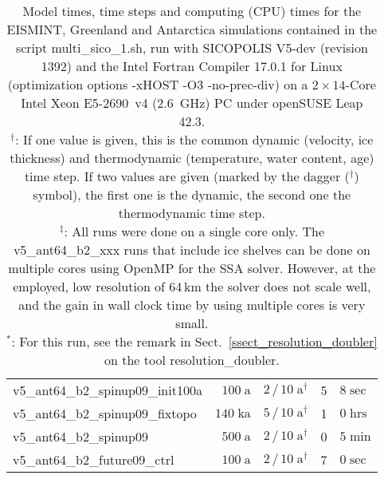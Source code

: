 \documentclass[12pt,a4paper]{article}
\begin{document}
\begin{appendix}
\begin{table}[ht]
\begin{tabular}{lrrr@{.}l}
v5\_ant64\_b2\_spinup09\_init100a    &  $100\;\mathrm{ a}$\hspace*{1.47em}
                                     & $2\,/\,10\;\mathrm{ a}^{\dagger}$\hspace*{0.6em}
                                     &  5&$8\;\mathrm{sec}$ \\
v5\_ant64\_b2\_spinup09\_fixtopo     &  $140\;\mathrm{ka}$\hspace*{1.0em}
                                     &  $5\,/\,10\;\mathrm{ a}^{\dagger}$\hspace*{0.6em}
                                     &  1&$0\;\mathrm{hrs}$ \\
v5\_ant64\_b2\_spinup09              &  $500\;\mathrm{ a}$\hspace*{1.47em}
                                     & $2\,/\,10\;\mathrm{ a}^{\dagger}$\hspace*{0.6em}
                                     &  0&$5\;\mathrm{min}$ \\
v5\_ant64\_b2\_future09\_ctrl        &  $100\;\mathrm{ a}$\hspace*{1.47em}
                                     & $2\,/\,10\;\mathrm{ a}^{\dagger}$\hspace*{0.6em}
                                     &  7&$0\;\mathrm{sec}$ \\ \hline
\end{tabular}
\caption{Model times, time steps and computing (CPU) times for the EISMINT, Greenland and Antarctica simulations contained in the script multi\_sico\_1.sh, run with SICOPOLIS V5-dev (revision 1392) and the Intel Fortran Compiler 17.0.1 for Linux (optimization options -xHOST -O3 -no-prec-div) on a $2\times{}14$-Core Intel Xeon E5-2690~v4 (2.6~GHz) PC under openSUSE Leap 42.3.
\protect\\
{}$^\dagger$: If one value is given, this is the common dynamic (velocity, ice thickness) and thermodynamic (temperature, water content, age) time step. If two values are given (marked by the dagger ($^\dagger$) symbol), the first one is the dynamic, the second one the thermodynamic time step.
\protect\\
{}$^\ddagger$: All runs were done on a single core only. The v5\_ant64\_b2\_xxx runs that include ice shelves can be done on multiple cores using OpenMP for the SSA solver. However, at the employed, low resolution of 64\,km the solver does not scale well, and the gain in wall clock time by using multiple cores is very small.
\protect\\
{}$^\ast$: For this run, see the remark in Sect.~\ref{ssect_resolution_doubler} on the tool resolution\_doubler.}
\label{table_comp_times}
\end{table}

\end{appendix}

\clearpage




\end{document}
